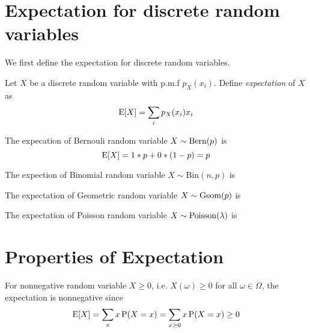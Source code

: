 \section{Expectation for discrete random variables}
We first define the expectation for discrete random variables.

Let $X$ be a discrete random variable with p.m.f $p_X(x_i)$. Define \textit{expectation} of $X$ as
$$\operatorname{E}[X] = \sum_i p_X(x_i) x_i$$

\begin{exmp}{}
The expecation of Bernouli random variable $X\sim \mathrm{Bern}(p)$ is
$$\operatorname{E}[X] = 1*p + 0 * (1-p) = p$$
\end{exmp}

\begin{exmp}{}
	The expection of Binomial random variable $X\sim \mathrm{Bin}(n,p)$ is
\end{exmp}

\begin{exmp}{}
	The expectation of Geometric random variable $X \sim \mathrm{Geom}(p)$ is
\end{exmp}

\begin{exmp}{}
	The expectation of Poisson random variable $X\sim \mathrm{Poisson}(\lambda)$ is
\end{exmp}

\section{Properties of Expectation}
For nonnegative random variable $X\geq 0$, i.e. $X(\omega) \geq 0$ for all $\omega\in \Omega$, the expectation is nonnegative since
$$\operatorname{E}[X] = \sum_x x\operatorname{P}(X=x) = \sum_{x\geq 0} x\operatorname{P}(X=x) \geq 0$$

